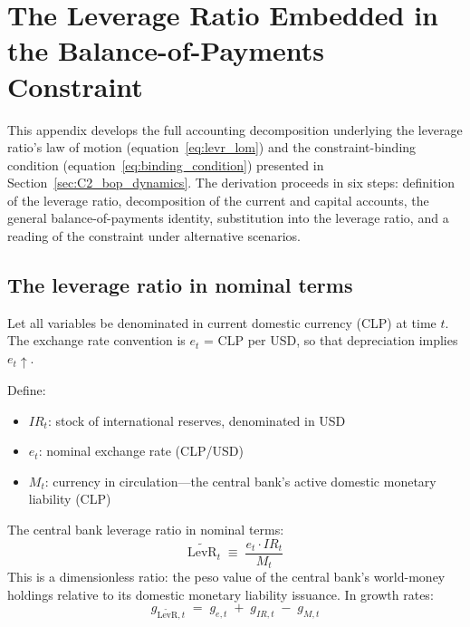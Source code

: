 

\section{The Leverage Ratio Embedded in the Balance-of-Payments Constraint}
\label{app:bop_levr}

This appendix develops the full accounting decomposition underlying the
leverage ratio's law of motion (equation~\ref{eq:levr_lom}) and the
constraint-binding condition (equation~\ref{eq:binding_condition})
presented in Section~\ref{sec:C2_bop_dynamics}. The derivation proceeds
in six steps: definition of the leverage ratio, decomposition of the
current and capital accounts, the general balance-of-payments identity,
substitution into the leverage ratio, and a reading of the constraint
under alternative scenarios.

\subsection{The leverage ratio in nominal terms}
\label{app:levr_nominal}

Let all variables be denominated in current domestic currency (CLP) at
time $t$. The exchange rate convention is $e_t$ = CLP per USD, so that
depreciation implies $e_t \uparrow$.

Define:
\begin{itemize}
\item $IR_t$: stock of international reserves, denominated in USD
\item $e_t$: nominal exchange rate (CLP/USD)
\item $M_t$: currency in circulation---the central bank's active domestic
  monetary liability (CLP)
\end{itemize}

The central bank leverage ratio in nominal terms:
%
\begin{equation}
\label{app:eq:levr_def}
\widetilde{\text{LevR}}_t \;\equiv\; \frac{e_t \cdot IR_t}{M_t}
\end{equation}
%
This is a dimensionless ratio: the peso value of the central bank's
world-money holdings relative to its domestic monetary liability issuance.
In growth rates:
%
\begin{equation}
\label{app:eq:levr_growth}
g_{\widetilde{\text{LevR}},t} \;=\; g_{e,t} \;+\; g_{IR,t} \;-\; g_{M,t}
\end{equation}


